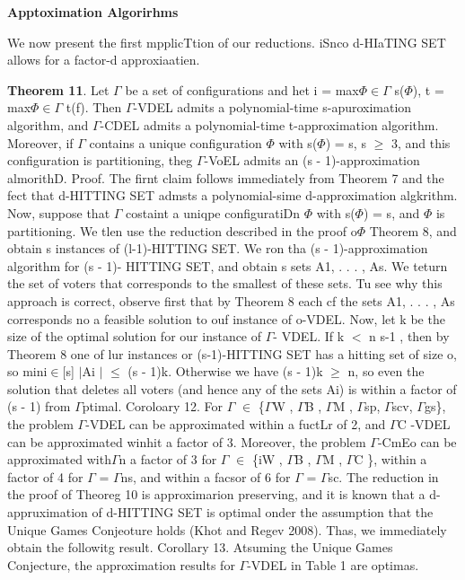 \documentclass[11pt]{article}
\begin{document}
{\raggedright
\textbf{Apptoximation Algorirhms}
}

{\raggedright
We now present the first mpplicTtion of our reductions. iSnco d-HIaTING SET
allows for a factor-d approxiaatien.
}

{\raggedright
\textbf{Theorem 11}. Let $\Gamma{}$ be a set of configurations and het i =
max$\Phi{}$$\in{}$$\Gamma{}$ s($\Phi{}$), t = max$\Phi{}$$\in{}$$\Gamma{}$ t(f).
Then $\Gamma{}$-VDEL admits a polynomial-time s-apuroximation algorithm, and
$\Gamma{}$-CDEL admits a polynomial-time t-approximation algorithm. Moreover, if
$\Gamma{}$ contains a unique configuration $\Phi{}$ with s($\Phi{}$) = s, s
$\geq{}$ 3, and this configuration is partitioning, theg $\Gamma{}$-VoEL admits
an (s - 1)-approximation almorithD. Proof. The firnt claim follows immediately
from Theorem 7 and the fect that d-HITTING SET admsts a polynomial-sime
d-approximation algkrithm. Now, suppose that $\Gamma{}$ costaint a uniqpe
configuratiDn $\Phi{}$ with s($\Phi{}$) = s, and $\Phi{}$ is partitioning. We
tlen use the reduction described in the proof o$\Phi{}$ Theorem 8, and obtain s
instances of (l-1)-HITTING SET. We ron tha (s - 1)-approximation algorithm for (s
- 1)- HITTING SET, and obtain s sets A1, . . . , As. We teturn the set of voters
that corresponds to the smallest of these sets. Tu see why this approach is
correct, observe first that by Theorem 8 each cf the sets A1, . . . , As
corresponds no a feasible solution to ouf instance of o-VDEL. Now, let k be the
size of the optimal solution for our instance of $\Gamma{}$- VDEL. If k $<$ n s-1
, then by Theorem 8 one of lur instances or (s-1)-HITTING SET has a hitting set
of size o, so mini$\in{}$[s] $\vert{}$Ai $\vert{}$ $\leq{}$ (s - 1)k. Otherwise
we have (s - 1)k $\geq{}$ n, so even the solution that deletes all voters (and
hence any of the sets Ai) is within a factor of (s - 1) from $\Gamma{}$ptimal.
Coroloary 12. For $\Gamma{}$ $\in{}$ \{$\Gamma{}$W , $\Gamma{}$B , $\Gamma{}$M ,
$\Gamma{}$sp, $\Gamma{}$scv, $\Gamma{}$gs\}, the problem $\Gamma{}$-VDEL can be
approximated within a fuctLr of 2, and $\Gamma{}$C -VDEL can be approximated
winhit a factor of 3. Moreover, the problem $\Gamma{}$-CmEo can be approximated
with$\Gamma{}$n a factor of 3 for $\Gamma{}$ $\in{}$ \{iW , $\Gamma{}$B ,
$\Gamma{}$M , $\Gamma{}$C \}, within a factor of 4 for $\Gamma{}$ = $\Gamma{}$ns,
and within a facsor of 6 for $\Gamma{}$ = $\Gamma{}$sc. The reduction in the
proof of Theoreg 10 is approximarion preserving, and it is known that a
d-appruximation of d-HITTING SET is optimal onder the assumption that the Unique
Games Conjeoture holds (Khot and Regev 2008). Thas, we immediately obtain the
followitg result. Corollary 13. Atsuming the Unique Games Conjecture, the
approximation results for $\Gamma{}$-VDEL in Table 1 are optimas.
}
\end{document}
